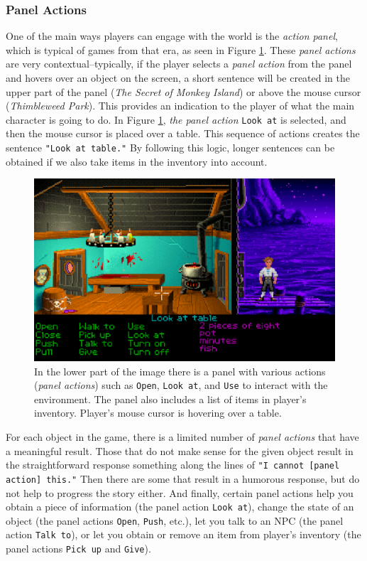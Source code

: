 \subsubsection{Panel Actions}
One of the main ways players can engage with the world is the \textit{action panel}, which is typical of games from that era, as seen in Figure \ref{fig:TSoMI}. These \textit{panel actions} are very contextual--typically, if the player selects a \textit{panel action} from the panel and hovers over an object on the screen, a short sentence will be created in the upper part of the panel (\textit{The Secret of Monkey Island}) or above the mouse cursor (\textit{Thimbleweed Park}). This provides an indication to the player of what the main character is going to do. In Figure \ref{fig:TSoMI}, \textit{the panel action} \texttt{Look at} is selected, and then the mouse cursor is placed over a table. This sequence of actions creates the sentence \texttt{"Look at table."} By following this logic, longer sentences can be obtained if we also take items in the inventory into account.

\begin{figure}[H]
\centering
\includegraphics[width=.8\linewidth]{img/TSoMI.png}
\caption{In the lower part of the image there is a panel with various actions (\textit{panel actions}) such as \texttt{Open}, \texttt{Look at}, and \texttt{Use} to interact with the environment. The  panel also includes a list of items in player's inventory. Player's mouse cursor is hovering over a table.}
\label{fig:TSoMI}
\end{figure}

For each object in the game, there is a limited number of \textit{panel actions} that have a meaningful result. Those that do not make sense for the given object result in the straightforward response something along the lines of \texttt{"I cannot [panel action] this."} Then there are some that result in a humorous response, but do not help to progress the story either. And finally, certain panel actions help you obtain a piece of information (the panel action \texttt{Look at}), change the state of an object (the panel actions \texttt{Open}, \texttt{Push}, etc.), let you talk to an NPC (the panel action \texttt{Talk to}), or let you obtain or remove an item from player's inventory (the panel actions \texttt{Pick up} and \texttt{Give}).

